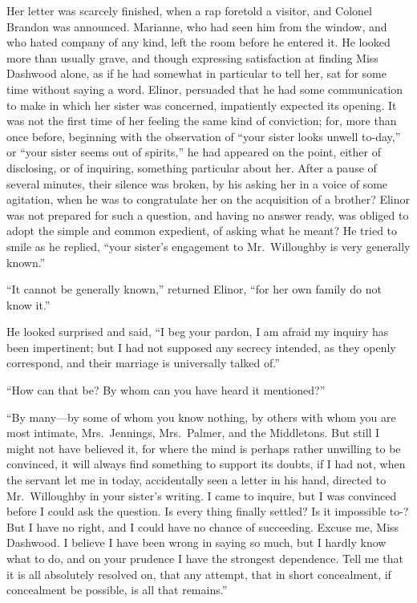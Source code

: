 Her letter was scarcely finished, when a rap
foretold a visitor, and Colonel Brandon was announced.
Marianne, who had seen him from the window, and who hated
company of any kind, left the room before he entered it.
He looked more than usually grave, and though expressing
satisfaction at finding Miss Dashwood alone, as if he
had somewhat in particular to tell her, sat for some
time without saying a word.  Elinor, persuaded that he
had some communication to make in which her sister
was concerned, impatiently expected its opening.
It was not the first time of her feeling the same kind
of conviction; for, more than once before, beginning with
the observation of ``your sister looks unwell to-day,''
or ``your sister seems out of spirits,'' he had appeared
on the point, either of disclosing, or of inquiring,
something particular about her.  After a pause of several
minutes, their silence was broken, by his asking her
in a voice of some agitation, when he was to congratulate
her on the acquisition of a brother?  Elinor was not
prepared for such a question, and having no answer ready,
was obliged to adopt the simple and common expedient,
of asking what he meant?  He tried to smile as he replied,
``your sister's engagement to Mr.\ Willoughby is very generally
known.''

``It cannot be generally known,'' returned Elinor,
``for her own family do not know it.''

He looked surprised and said, ``I beg your pardon,
I am afraid my inquiry has been impertinent; but I had not
supposed any secrecy intended, as they openly correspond,
and their marriage is universally talked of.''

``How can that be? By whom can you have heard
it mentioned?''

``By many---by some of whom you know nothing, by others
with whom you are most intimate, Mrs.\ Jennings, Mrs.\ Palmer,
and the Middletons.  But still I might not have believed it,
for where the mind is perhaps rather unwilling to
be convinced, it will always find something to support
its doubts, if I had not, when the servant let me in today,
accidentally seen a letter in his hand, directed to
Mr.\ Willoughby in your sister's writing.  I came to inquire,
but I was convinced before I could ask the question.
Is every thing finally settled?  Is it impossible to-?
But I have no right, and I could have no chance of succeeding.
Excuse me, Miss Dashwood.  I believe I have been wrong
in saying so much, but I hardly know what to do, and on
your prudence I have the strongest dependence.  Tell me
that it is all absolutely resolved on, that any attempt,
that in short concealment, if concealment be possible,
is all that remains.''


